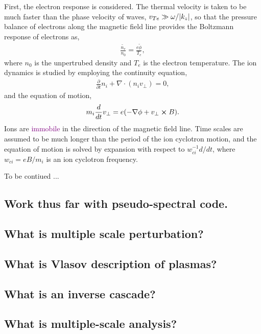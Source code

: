 First, the electron response is considered. The thermal velocity is taken to be much faster than the phase velocity of waves, $v_{Te} \gg \omega/\abs{k_z}$, so that the pressure balance of electrons along the magnetic field line provides the Boltzmann response of electrons as, 
\begin{align}
	\frac{\tilde{n_e}}{n_0} = \frac{e \tilde{\phi}}{T_e},
\end{align}
where $n_0$ is the unpertrubed density and $T_e$ is the electron temperature. The ion dynamics is studied by employing the continuity equation, 
\begin{align}
	\frac{\partial }{\partial t} n_i + \nabla \cdot (n_i v_{\perp}) = 0,
\end{align}
and the equation of motion, 
\begin{align}
	m_i \frac{d}{d t} v_{\perp} = e (- \nabla \phi + v_{\perp} \cross B).
\end{align}
Ions are \textcolor{purple}{immobile} in the direction of the magnetic field line. Time scales are assumed to be much longer than the period of the ion cyclotron motion, and the equation of motion is solved by expansion with respect to $w_{ci}^{-1} d/dt$, where $w_{ci} = eB/m_i$ is an ion cyclotron frequency. 

To be contiued \cite{diamond_itoh_itoh_2010}...

\subsection{Work thus far with pseudo-spectral code.}

\subsection{What is multiple scale perturbation?}

\subsection{What is Vlasov description of plasmas?}

\subsection{What is an inverse cascade?}

\subsection{What is multiple-scale analysis?}
